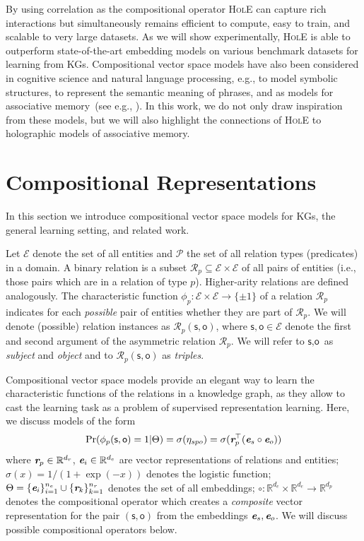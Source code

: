 \documentclass[letterpaper]{article}
\renewcommand{\vec}[1]{\textit{\textbf{#1}}}
\newcommand{\ve}{\vec{e}}
\newcommand{\vr}{\vec{r}}
\newcommand{\comp}{\circ}
\newcommand{\hole}{\textsc{HolE}\xspace}
\newcommand{\Set}[1]{\mathcal{#1}}
\newcommand{\transp}{\top}
\newcommand{\R}{\mathbb{R}}
\newcommand{\SE}{\Set{E}}
\newcommand{\SR}{\Set{R}}
\newcommand{\Ss}{\textsf{s}}
\newcommand{\So}{\textsf{o}}
\begin{document}
By using correlation as the compositional operator \hole can capture rich
interactions but simultaneously remains efficient to compute, easy to train, and
scalable to very large datasets.
As we will show experimentally, \hole is able to outperform
state-of-the-art embedding models on various benchmark
datasets for learning from KGs.
Compositional vector space models have also been considered in cognitive science
and natural language processing, e.g., to model symbolic structures, to
represent the semantic meaning of phrases, and as models for associative
memory~(see e.g.,
\cite{smolensky_tensor_1990,plate1995holographic,mitchell-lapata:2008:ACLMain,socher2012semantic}).
In this work, we do not only draw inspiration from these models, but we will
also highlight the connections of \hole to holographic models of associative
memory.





\section{Compositional Representations}
\label{sec:comp-rep}

In this section we introduce compositional vector space models
for KGs, the general learning setting, and related work. 

Let $\SE$ denote the set of all entities and $\Set{P}$ the set of all relation
types (predicates) in a domain.
A binary relation is a subset $\SR_p \subseteq \SE \times \SE$ of all pairs of
entities (i.e., those pairs which are in a relation of type $p$). Higher-arity
relations are defined analogously.
The characteristic function ${\phi_{p} : \SE \times \SE \to \{\pm 1\}}$ of a
relation $\SR_p$ indicates for each \emph{possible} pair of entities whether
they are part of $\SR_p$.
We will denote (possible) relation instances as $\SR_p(\Ss,
\So)$, where $\Ss, \So \in \SE$ denote the first and second argument of the
asymmetric relation $\SR_p$. 
We will refer to $\Ss, \So$ as \emph{subject} and \emph{object}
and to $\SR_p(\Ss, \So)$ as \emph{triples}.


Compositional vector space models provide an elegant way to learn the
characteristic functions of the relations in a knowledge graph, as they allow to
cast the learning task as a problem of supervised representation learning.
Here, we discuss models of the form 
\begin{equation}
  \label{eq:comp}
  \Pr(\phi_p(\Ss, \So) = 1 | \Theta) = \sigma(\eta_{spo}) = \sigma(\vr_p^\transp (\ve_s \comp \ve_o))
\end{equation}
where $\vr_p \in \R^{d_r}$, $\ve_i \in \R^{d_e}$ are vector representations
of relations and entities;
$\sigma(x) = 1 / (1 + \exp(-x))$ denotes the logistic function;
$\Theta = \{\ve_i\}_{i=1}^{n_e} \cup \{\vr_k\}_{k=1}^{n_r}$ denotes the set of
all embeddings;
$\circ: \R^{d_e} \times \R^{d_e} \to \R^{d_p}$ denotes the compositional
operator which creates a \emph{composite} vector representation for the pair
$(\Ss, \So)$ from the embeddings $\ve_s, \ve_o$. We will discuss possible
compositional operators below.
\end{document}
